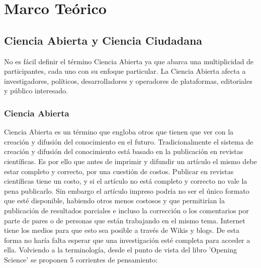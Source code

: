 \chapter{Marco Teórico}
\section{Ciencia  Abierta y Ciencia Ciudadana}

No es fácil definir el término Ciencia Abierta ya que abarca una multiplicidad de participantes, cada uno con su enfoque particular. La Ciencia Abierta afecta a investigadores, políticos, desarrolladores y operadores de plataformas, editoriales y público interesado. 

\subsection{Ciencia Abierta}
Ciencia Abierta es un término que engloba otros que tienen que ver con la creación y difusión del conocimiento en el futuro. Tradicionalmente el sistema de creación y difusión del conocimiento está basado en la publicación en revistas científicas. Es por ello que antes de imprimir y difundir un artículo el mismo debe estar completo y correcto, por una cuestión de costos. Publicar en revistas científicas tiene un costo, y si el artículo no está completo y correcto no vale la pena publicarlo. Sin embargo el artículo impreso podría no ser el único formato que esté disponible, habiendo otros menos costosos y que permitirían la publicación de resultados parciales e incluso la corrección o los comentarios por parte de pares o de personas que están trabajando en el mismo tema. Internet tiene los medios para que esto sea posible a través de Wikis y blogs. De esta forma no haría falta esperar que una investigación esté completa para acceder a ella.
Volviendo a la terminología, desde el punto de vista del libro 'Opening Science' \cite{bartling2014opening} se proponen 5 corrientes de pensamiento:
